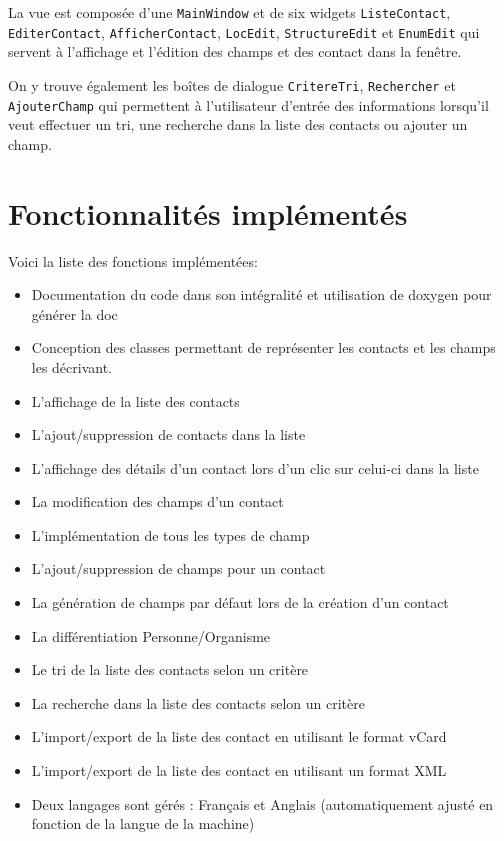 \documentclass[a4paper,12pt]{report}
\begin{document}
La vue est composée d'une \texttt{MainWindow} et de six widgets \texttt{ListeContact}, \texttt{EditerContact}, \texttt{AfficherContact}, \texttt{LocEdit}, \texttt{StructureEdit} et \texttt{EnumEdit} qui servent à l'affichage et l'édition des champs et des contact dans la fenêtre.

On y trouve également les boîtes de dialogue \texttt{CritereTri}, \texttt{Rechercher} et \texttt{AjouterChamp} qui permettent à l'utilisateur d'entrée des informations lorsqu'il veut effectuer un tri, une recherche dans la liste des contacts ou ajouter un champ.

\chapter{Fonctionnalités implémentés}
\par
Voici la liste des fonctions implémentées:
\begin{itemize}
	\item Documentation du code dans son intégralité et utilisation de doxygen pour générer la doc
	\item Conception des classes permettant de représenter les contacts et les champs les décrivant.
	\item L'affichage de la liste des contacts
	\item L'ajout/suppression de contacts dans la liste
	\item L'affichage des détails d'un contact lors d'un clic sur celui-ci dans la liste
	\item La modification des champs d'un contact
	\item L'implémentation de tous les types de champ
	\item L'ajout/suppression de champs pour un contact
	\item La génération de champs par défaut lors de la création d'un contact
	\item La différentiation Personne/Organisme
	\item Le tri de la liste des contacts selon un critère
	\item La recherche dans la liste des contacts selon un critère
	\item L'import/export de la liste des contact en utilisant le format vCard
	\item L'import/export de la liste des contact en utilisant un format XML
	\item Deux langages sont gérés : Français et Anglais (automatiquement ajusté en fonction de la langue de la machine)
\end{itemize}
\end{document}
